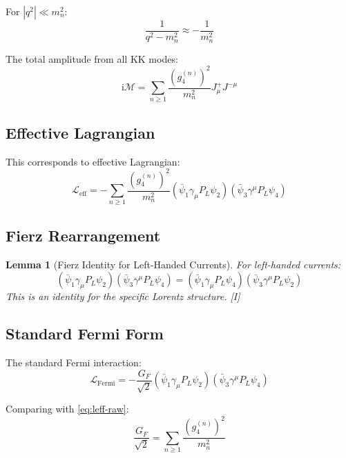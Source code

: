 \documentclass[11pt,a4paper]{article}
\newtheorem{lemma}[theorem]{Lemma}
\newcommand{\ii}{\mathrm{i}}
\begin{document}
For $|q^2| \ll m_n^2$:
\begin{equation}
\frac{1}{q^2 - m_n^2} \approx -\frac{1}{m_n^2}
\label{eq:low-energy}
\end{equation}

The total amplitude from all KK modes:
\begin{equation}
\ii \mathcal{M} = \sum_{n \geq 1} \frac{(g_4^{(n)})^2}{m_n^2} J_\mu^+ J^{-\mu}
\label{eq:amplitude-total}
\end{equation}

\subsection{Effective Lagrangian}

This corresponds to effective Lagrangian:
\begin{equation}
\mathcal{L}_{\text{eff}} = -\sum_{n \geq 1} \frac{(g_4^{(n)})^2}{m_n^2}
(\bar{\psi}_1 \gamma_\mu P_L \psi_2)(\bar{\psi}_3 \gamma^\mu P_L \psi_4)
\label{eq:leff-raw}
\end{equation}

\subsection{Fierz Rearrangement}

\begin{lemma}[Fierz Identity for Left-Handed Currents]
\label{lem:fierz}
For left-handed currents:
\begin{equation}
(\bar{\psi}_1 \gamma_\mu P_L \psi_2)(\bar{\psi}_3 \gamma^\mu P_L \psi_4)
= (\bar{\psi}_1 \gamma_\mu P_L \psi_4)(\bar{\psi}_3 \gamma^\mu P_L \psi_2)
\label{eq:fierz}
\end{equation}
This is an identity for the specific Lorentz structure. [I]
\end{lemma}

\subsection{Standard Fermi Form}

The standard Fermi interaction:
\begin{equation}
\mathcal{L}_{\text{Fermi}} = -\frac{G_F}{\sqrt{2}}
(\bar{\psi}_1 \gamma_\mu P_L \psi_2)(\bar{\psi}_3 \gamma^\mu P_L \psi_4)
\label{eq:fermi-standard}
\end{equation}

Comparing with \eqref{eq:leff-raw}:
\begin{equation}
\frac{G_F}{\sqrt{2}} = \sum_{n \geq 1} \frac{(g_4^{(n)})^2}{m_n^2}
\label{eq:gf-raw}
\end{equation}
\end{document}
